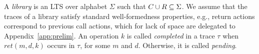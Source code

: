 A \emph{library} is an LTS over alphabet $\Sigma$ such that $C \cup R\subseteq \Sigma$. 
We assume that the traces of a library satisfy standard well-formedness properties, 
e.g., return actions correspond to previous call actions, which for lack of 
space are delegated to Appendix~\ref{app:prelim}. An operation $k$ is called \emph{completed} in a trace $\tau$ when
$ret(m,d,k)$ occurs in $\tau$, for some $m$ and $d$. Otherwise, it is called \emph{pending}.


%
%
%  
%  
%  
%
%

